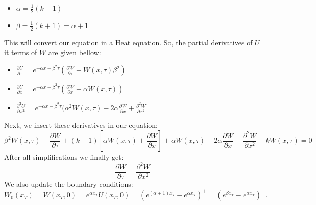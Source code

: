 \documentclass[a4paper]{report}
\begin{document}
\begin{itemize}
\begin{itemize}
\item $\alpha = \frac{1}{2}(k-1)$
\item $\beta = \frac{1}{2}(k+1)=\alpha+1$
\end{itemize}
This will convert our equation in a Heat equation. So, the partial derivatives of $U$ it terms of $W$ are given bellow:
\begin{itemize}
\item $\frac{\partial U}{\partial \tau} = e^{-\alpha x-\beta^2\tau}(\frac{\partial W}{\partial \tau} - W(x,\tau)\beta^2)$ 
\item $\frac{\partial U}{\partial x} = e^{-\alpha x-\beta^2\tau}(\frac{\partial W}{\partial x} - \alpha W(x,\tau))$
\item $\frac{\partial^2 U}{\partial x^2} = e^{-\alpha x-\beta^2\tau}(\alpha^2 W(x,\tau) - 2\alpha\frac{\partial W}{\partial x} + \frac{\partial^2 W}{\partial x^2}$
\end{itemize}

Next, we insert these derivatives in our equation: 
\begin{equation}
\beta^2W(x,\tau) - \frac{\partial W}{\partial \tau} + (k-1)[\alpha W(x,\tau)+\frac{\partial W}{\partial x}]+\alpha W(x,\tau)-2\alpha\frac{\partial W}{\partial x} + \frac{\partial^2 W}{\partial x^2}-k W(x,\tau)=0
\end{equation}
After all simplifications we finally get:
\begin{equation}
\frac{\partial W}{\partial \tau} = \frac{\partial^2 W}{\partial x^2}
\end{equation}
We also update the boundary conditions:
$W_0(x_T) = W(x_T,0)=e^{\alpha x_T}U(x_T,0)=(e^{(\alpha+1)x_T}-e^{\alpha x_T})^+ = (e^{\beta x_T} - e^{\alpha x_T})^+.$\\


\end{itemize}
\end{document}
